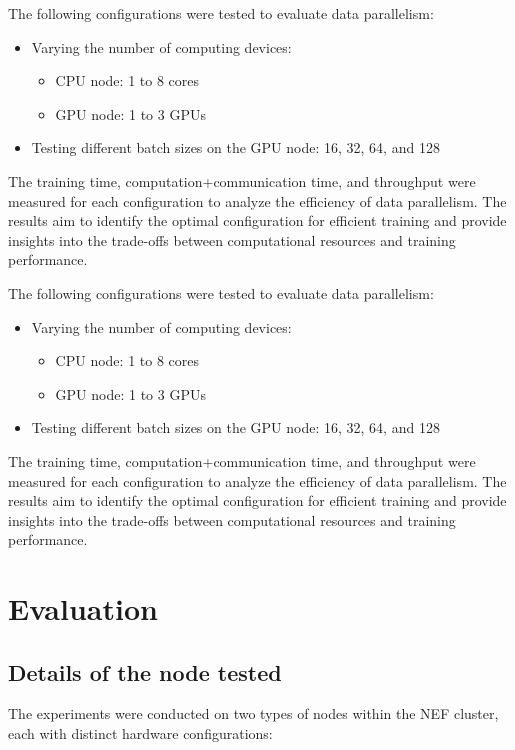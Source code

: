 \documentclass{article}
\begin{document}
The following configurations were tested to evaluate data parallelism:
\begin{itemize}
    \item Varying the number of computing devices:
        \begin{itemize}
            \item CPU node: 1 to 8 cores
            \item GPU node: 1 to 3 GPUs
        \end{itemize}
    \item Testing different batch sizes on the GPU node: 16, 32, 64, and 128
\end{itemize}
The training time, computation+communication time, and throughput were measured for each configuration to analyze the efficiency of data parallelism. The results aim to identify the optimal configuration for efficient training and provide insights into the trade-offs between computational resources and training performance.

The following configurations were tested to evaluate data parallelism:
\begin{itemize}
    \item Varying the number of computing devices:
        \begin{itemize}
            \item CPU node: 1 to 8 cores
            \item GPU node: 1 to 3 GPUs
        \end{itemize}
    \item Testing different batch sizes on the GPU node: 16, 32, 64, and 128
\end{itemize}
The training time, computation+communication time, and throughput were measured for each configuration to analyze the efficiency of data parallelism. The results aim to identify the optimal configuration for efficient training and provide insights into the trade-offs between computational resources and training performance.

\section{Evaluation}
\subsection{Details of the node tested}
The experiments were conducted on two types of nodes within the NEF cluster, each with distinct hardware configurations:
\end{document}

